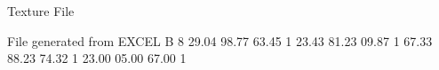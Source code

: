 Texture File

File generated from EXCEL
B 8
29.04 98.77 63.45 1
23.43 81.23 09.87 1
67.33 88.23 74.32 1
23.00 05.00 67.00 1
